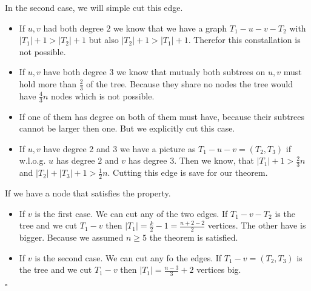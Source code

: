\documentclass[11pt,a4paper,ngerman]{article}
\begin{document}
In the second case, we will simple cut this edge.
\begin{itemize}
     \item If $u,v$ had both degree $2$ we know that we have a graph $T_1 - u - v - T_2$
        with $|T_1| + 1 > |T_2| + 1$ but also $|T_2| + 1 > |T_1| + 1$. Therefor this
        constallation is not possible.
    \item If $u,v$ have both degree $3$ we know that mutualy both subtrees on $u,v$ must hold
        more than $\frac{2}{3}$ of the tree. Because they share no nodes the tree would have $\frac{4}{3}n$ nodes
        which is not possible.
    \item If one of them has degree on both of them must have, because their subtrees cannot be larger then one.
        But we explicitly cut this case.
    \item If $u,v$ have degree 2 and 3 we have a picture as $T_1 - u - v = (T_2, T_3)$ if w.l.o.g. $u$ has degree
        $2$ and $v$ has degree $3$. Then we know, that $|T_1| + 1 > \frac{2}{3}n$ and $|T_2| + |T_3| + 1 > \frac{1}{2} n$.
        Cutting this edge is save for our theorem.
\end{itemize}

If we have a node that satisfies the property.
\begin{itemize}
    \item If $v$ is the first case. We can cut any of the two edges. If $T_1 - v - T_2$ is
        the tree and we cut $T_1 - v$ then $|T_1| = \frac{k}{2} -1 = \frac{n+2 - 2}{2}$ vertices. The other have is bigger.
        Because we assumed $n \geq 5$ the theorem is satisfied.
    \item If $v$ is the second case. We can cut any fo the edges. If $T_1 - v = (T_2, T_3)$ is the
        tree and we cut $T_1 - v$ then $|T_1| = \frac{n-3}{3} + 2$ vertices big.
\end{itemize}
\mbox{}\hfill $\square$
\label{LastPage}
\end{document}
